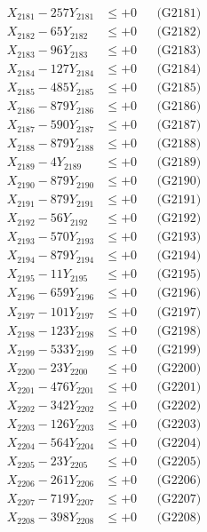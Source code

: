 \documentclass[a4paper,10pt]{article}
\begin{document}
{\begin{align}
\allowbreak
X_{2181} - 257Y_{2181} &\leq +0 && \text{(G2181)} \\
X_{2182} - 65Y_{2182} &\leq +0 && \text{(G2182)} \\
X_{2183} - 96Y_{2183} &\leq +0 && \text{(G2183)} \\
X_{2184} - 127Y_{2184} &\leq +0 && \text{(G2184)} \\
X_{2185} - 485Y_{2185} &\leq +0 && \text{(G2185)} \\
X_{2186} - 879Y_{2186} &\leq +0 && \text{(G2186)} \\
X_{2187} - 590Y_{2187} &\leq +0 && \text{(G2187)} \\
X_{2188} - 879Y_{2188} &\leq +0 && \text{(G2188)} \\
X_{2189} - 4Y_{2189} &\leq +0 && \text{(G2189)} \\
X_{2190} - 879Y_{2190} &\leq +0 && \text{(G2190)} \\
\allowbreak
X_{2191} - 879Y_{2191} &\leq +0 && \text{(G2191)} \\
X_{2192} - 56Y_{2192} &\leq +0 && \text{(G2192)} \\
X_{2193} - 570Y_{2193} &\leq +0 && \text{(G2193)} \\
X_{2194} - 879Y_{2194} &\leq +0 && \text{(G2194)} \\
X_{2195} - 11Y_{2195} &\leq +0 && \text{(G2195)} \\
X_{2196} - 659Y_{2196} &\leq +0 && \text{(G2196)} \\
X_{2197} - 101Y_{2197} &\leq +0 && \text{(G2197)} \\
X_{2198} - 123Y_{2198} &\leq +0 && \text{(G2198)} \\
X_{2199} - 533Y_{2199} &\leq +0 && \text{(G2199)} \\
X_{2200} - 23Y_{2200} &\leq +0 && \text{(G2200)} \\
\allowbreak
X_{2201} - 476Y_{2201} &\leq +0 && \text{(G2201)} \\
X_{2202} - 342Y_{2202} &\leq +0 && \text{(G2202)} \\
X_{2203} - 126Y_{2203} &\leq +0 && \text{(G2203)} \\
X_{2204} - 564Y_{2204} &\leq +0 && \text{(G2204)} \\
X_{2205} - 23Y_{2205} &\leq +0 && \text{(G2205)} \\
X_{2206} - 261Y_{2206} &\leq +0 && \text{(G2206)} \\
X_{2207} - 719Y_{2207} &\leq +0 && \text{(G2207)} \\
X_{2208} - 398Y_{2208} &\leq +0 && \text{(G2208)} \\

\end{align}}
\end{document}

